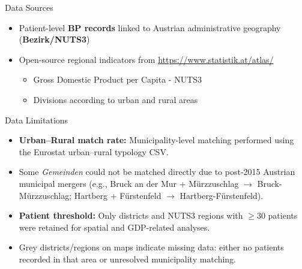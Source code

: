 \begin{frame}{Data Sources}

\begin{itemize}
    \item Patient-level \textbf{BP records} linked to Austrian administrative geography (\textbf{Bezirk/NUTS3})
    \item Open-source regional indicators from \url{https://www.statistik.at/atlas/}
    \begin{itemize}
        \item Gross Domestic Product per Capita - NUTS3
        \item Divisions according to urban and rural areas
    \end{itemize}
\end{itemize}

\end{frame}


\begin{frame}{Data Limitations}

\small

\begin{itemize}

\item \textbf{Urban--Rural match rate:} Municipality-level matching performed using the Eurostat urban--rural typology CSV.

\item Some \textit{Gemeinden} could not be matched directly due to post-2015 Austrian municipal mergers 
(e.g., Bruck an der Mur + Mürzzuschlag $\rightarrow$ Bruck-Mürzzuschlag; 
Hartberg + Fürstenfeld $\rightarrow$ Hartberg-Fürstenfeld).

\item \textbf{Patient threshold:} Only districts and NUTS3 regions with $\geq 30$ patients were retained for spatial and GDP-related analyses.

\item Grey districts/regions on maps indicate missing data:
either no patients recorded in that area or unresolved municipality matching.

\end{itemize}

\end{frame}

